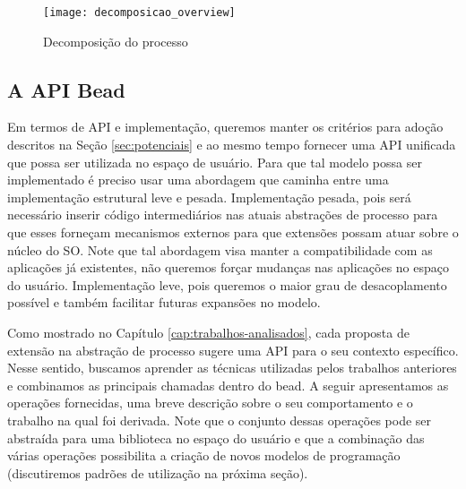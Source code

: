 \begin{figure}[!h]
  \centering
  \texttt{[image: decomposicao\_overview]}
  \caption{Decomposição do processo}
  \label{fig:decomposicao_proc}
\end{figure}

\subsection{A API Bead}
\label{sec:api}

Em termos de API e implementação, queremos manter os critérios para adoção
descritos na Seção \ref{sec:potenciais} e ao mesmo tempo fornecer uma API
unificada que possa ser utilizada no espaço de usuário. Para que tal modelo
possa ser implementado é preciso usar uma abordagem que caminha entre uma
implementação estrutural leve e pesada. Implementação pesada, pois será
necessário inserir código intermediários nas atuais abstrações de processo para
que esses forneçam mecanismos externos para que extensões possam atuar sobre o
núcleo do SO.  Note que tal abordagem visa manter a compatibilidade com as
aplicações já existentes, não queremos forçar mudanças nas aplicações no espaço
do usuário. Implementação leve, pois queremos o maior grau de desacoplamento
possível e também facilitar futuras expansões no modelo.

Como mostrado no Capítulo \ref{cap:trabalhos-analisados}, cada proposta de
extensão na abstração de processo sugere uma API para o seu contexto
específico. Nesse sentido, buscamos aprender as técnicas utilizadas pelos
trabalhos anteriores e combinamos as principais chamadas dentro do bead. A
seguir apresentamos as operações fornecidas, uma breve descrição sobre o seu
comportamento  e o trabalho na qual foi derivada.  Note que o conjunto dessas
operações pode ser abstraída para uma biblioteca no espaço do usuário e que a
combinação das várias operações possibilita a criação de novos modelos de
programação (discutiremos padrões de utilização na próxima seção). 

